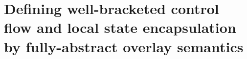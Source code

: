 \documentclass[aspectratio=169]{beamer}
\begin{document}


\section{Defining well-bracketed control flow and local state encapsulation by fully-abstract overlay semantics}
\end{document}
